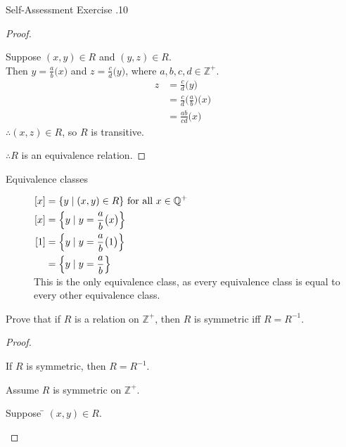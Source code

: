 \documentclass[\main/notes.tex]{subfiles}
\begin{document}
\begin{exercise}{Self-Assessment Exercise \thechapter.10}
\begin{questions}
\begin{answer}
\begin{proof}
\begin{description}
											\begin{subproof}[Subproof]
												Suppose $(x, y) \in R$ and $(y, z) \in R$.\\
												Then $y = \frac{a}{b}\bigl(x\bigr)$ and $z = \frac{c}{d}\bigl(y\bigr)$, where $a, b, c, d \in \mathbb{Z}^{+}$.
												\begin{align*}
													z &= \frac{c}{d}\bigl(y\bigr)\\
													&= \frac{c}{d}\bigl(\frac{a}{b}\bigr)\bigl(x\bigr)\\
													&= \frac{ab}{cd}\bigl(x\bigr)
												\end{align*}
												$\therefore (x, z) \in R$, so $R$ is transitive.
											\end{subproof}
									\end{description}
									$\therefore R$ is an equivalence relation.
								\end{proof}
								\begin{description}
									\item[Equivalence classes] $
									\begin{aligned}[t]
										[x] &= \{y \mid (x, y) \in R\} \text{ for all $x \in \mathbb{Q}^{+}$}\\
										[x] &= \Bigl\{y \mid y = \frac{a}{b}\bigl(x\bigr)\Bigr\}\\
										[1] &= \Bigl\{y \mid y = \frac{a}{b}\bigl(1\bigr)\Bigr\}\\
										&= \Bigl\{y \mid y = \frac{a}{b}\Bigr\}
									\end{aligned} $\\
									This is the only equivalence class, as every equivalence class is equal to every other equivalence class.
								\end{description}
							\end{answer}
						\pagebreak
						\item Prove that if $R$ is a relation on $\mathbb{Z}^{+}$, then $R$ is symmetric iff $R = R^{-1}$.
							\begin{answer}
								\begin{proof}
									$ $
									\begin{questions}[label=(\roman*)]
										\item If $R$ is symmetric, then $R = R^{-1}$.
											\begin{subproof}
												Assume $R$ is symmetric on $\mathbb{Z}^{+}$.
												\begin{tabbing}
													Suppose \quad \= $(x, y) \in R$.\\

\end{tabbing}
\end{subproof}
\end{questions}
\end{proof}
\end{answer}
\end{questions}
\end{exercise}
\end{document}
